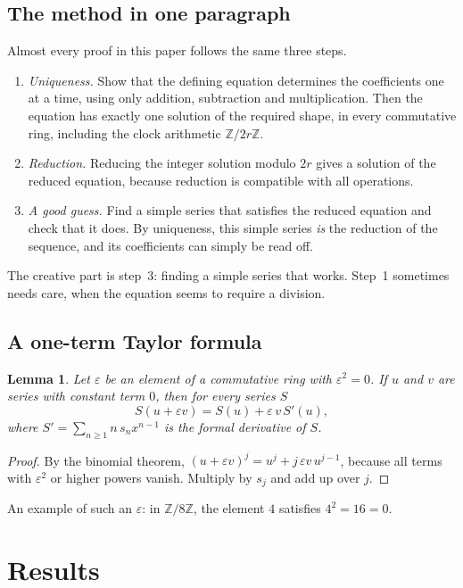 \documentclass[11pt,a4paper]{article}
\newtheorem{lemma}[theorem]{Lemma}
\theoremstyle{definition}
\theoremstyle{remark}
\newcommand{\Z}{\mathbb{Z}}
\begin{document}
\subsection{The method in one paragraph}
Almost every proof in this paper follows the same three steps.
\begin{enumerate}
\item \emph{Uniqueness.} Show that the defining equation determines the coefficients one at a time, using only
addition, subtraction and multiplication. Then the equation has exactly one solution of the required shape, in every
commutative ring, including the clock arithmetic $\Z/2r\Z$.
\item \emph{Reduction.} Reducing the integer solution modulo $2r$ gives a solution of the reduced equation,
because reduction is compatible with all operations.
\item \emph{A good guess.} Find a simple series that satisfies the reduced equation and check that it does. By uniqueness,
this simple series \emph{is} the reduction of the sequence, and its coefficients can simply be read off.
\end{enumerate}
The creative part is step~3: finding a simple series that works. Step~1 sometimes needs care, when the equation seems to
require a division.
\subsection{A one-term Taylor formula}
\begin{lemma}\label{lem:taylor}
Let $\varepsilon$ be an element of a commutative ring with $\varepsilon^2=0$. If $u$ and $v$ are series with constant
term $0$, then for every series $S$
\[
S(u+\varepsilon v)=S(u)+\varepsilon\,v\,S'(u),
\]
where $S'=\sum_{n\ge1}n\,s_nx^{n-1}$ is the formal derivative of $S$.
\end{lemma}

\begin{proof}
By the binomial theorem, $(u+\varepsilon v)^j=u^j+j\,\varepsilon v\,u^{j-1}$, because all terms with
$\varepsilon^2$ or higher powers vanish. Multiply by $s_j$ and add up over $j$.
\end{proof}
An example of such an $\varepsilon$: in $\Z/8\Z$, the element $4$ satisfies $4^2=16=0$.


\section{Results}\label{sec:results}
\end{document}

